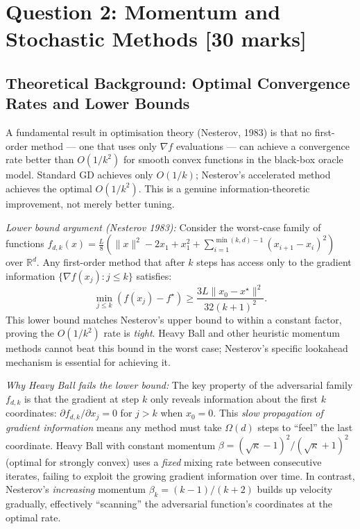 \documentclass[11pt,a4paper]{article}
\theoremstyle{definition}
\begin{document}
\section{Question 2: Momentum and Stochastic Methods \hfill [30 marks]}
\label{sec:q2}

\subsection{Theoretical Background: Optimal Convergence Rates and Lower Bounds}

A fundamental result in optimisation theory (Nesterov, 1983) is that no first-order method --- one that uses only $\nabla f$ evaluations --- can achieve a convergence rate better than $O(1/k^2)$ for smooth convex functions in the black-box oracle model. Standard GD achieves only $O(1/k)$; Nesterov's accelerated method achieves the optimal $O(1/k^2)$. This is a genuine information-theoretic improvement, not merely better tuning.

\noindent\textit{Lower bound argument (Nesterov 1983):} Consider the worst-case family of functions $f_{d,k}(x) = \frac{L}{8}\left(\|x\|^2 - 2x_1 + x_1^2 + \sum_{i=1}^{\min(k,d)-1}(x_{i+1}-x_i)^2\right)$ over $\mathbb{R}^d$. Any first-order method that after $k$ steps has access only to the gradient information $\{\nabla f(x_j) : j \leq k\}$ satisfies:
\begin{equation}
\min_{j \leq k}(f(x_j) - f^{\star}) \geq \frac{3L\|x_0 - x^{\star}\|^2}{32(k+1)^2}.
\end{equation}
This lower bound matches Nesterov's upper bound to within a constant factor, proving the $O(1/k^2)$ rate is \emph{tight}. Heavy Ball and other heuristic momentum methods cannot beat this bound in the worst case; Nesterov's specific lookahead mechanism is essential for achieving it.

\noindent\textit{Why Heavy Ball fails the lower bound:} The key property of the adversarial family $f_{d,k}$ is that the gradient at step $k$ only reveals information about the first $k$ coordinates: $\partial f_{d,k}/\partial x_j = 0$ for $j > k$ when $x_0 = 0$. This \emph{slow propagation of gradient information} means any method must take $\Omega(d)$ steps to ``feel'' the last coordinate. Heavy Ball with constant momentum $\beta = (\sqrt{\kappa}-1)^2/(\sqrt{\kappa}+1)^2$ (optimal for strongly convex) uses a \emph{fixed} mixing rate between consecutive iterates, failing to exploit the growing gradient information over time. In contrast, Nesterov's \emph{increasing} momentum $\beta_k = (k-1)/(k+2)$ builds up velocity gradually, effectively ``scanning'' the adversarial function's coordinates at the optimal rate.
\end{document}
